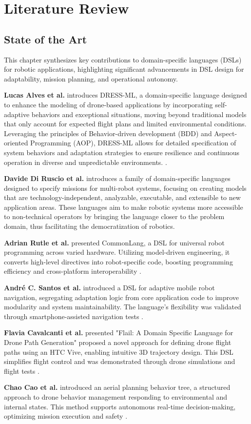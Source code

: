\chapter{Literature Review}
\label{sec:Literature Review}

\section{State of the Art}

This chapter synthesizes key contributions to domain-specific languages (DSLs) for robotic applications, highlighting significant advancements in DSL design for adaptability, mission planning, and operational autonomy.

\textbf{Lucas Alves et al.} introduces DRESS-ML, a domain-specific language designed to enhance the modeling of drone-based applications by incorporating self-adaptive behaviors and exceptional situations, moving beyond traditional models that only account for expected flight plans and limited environmental conditions. Leveraging the principles of Behavior-driven development (BDD) and Aspect-oriented Programming (AOP), DRESS-ML allows for detailed specification of system behaviors and adaptation strategies to ensure resilience and continuous operation in diverse and unpredictable environments.  \cite{Alves2022DRESSML}.

\textbf{Davide Di Ruscio et al.} introduces a family of domain-specific languages designed to specify missions for multi-robot systems, focusing on creating models that are technology-independent, analyzable, executable, and extensible to new application areas. These languages aim to make robotic systems more accessible to non-technical operators by bringing the language closer to the problem domain, thus facilitating the democratization of robotics\cite{Ruscio}.

\textbf{Adrian Rutle et al.} presented CommonLang, a DSL for universal robot programming across varied hardware. Utilizing model-driven engineering, it converts high-level directives into robot-specific code, boosting programming efficiency and cross-platform interoperability \cite{Rutle}.

\textbf{André C. Santos et al.} introduced a DSL for adaptive mobile robot navigation, segregating adaptation logic from core application code to improve modularity and system maintainability. The language's flexibility was validated through smartphone-assisted navigation tests \cite{santos}.

\textbf{Flavia Cavalcanti et al.} presented "Flail: A Domain Specific Language for Drone Path Generation" proposed a novel approach for defining drone flight paths using an HTC Vive, enabling intuitive 3D trajectory design. This DSL simplifies flight control and was demonstrated through drone simulations and flight tests \cite{Cavalcanti}.

\textbf{Chao Cao et al.} introduced an aerial planning behavior tree, a structured approach to drone behavior management responding to environmental and internal states. This method supports autonomous real-time decision-making, optimizing mission execution and safety \cite{Cao}.
